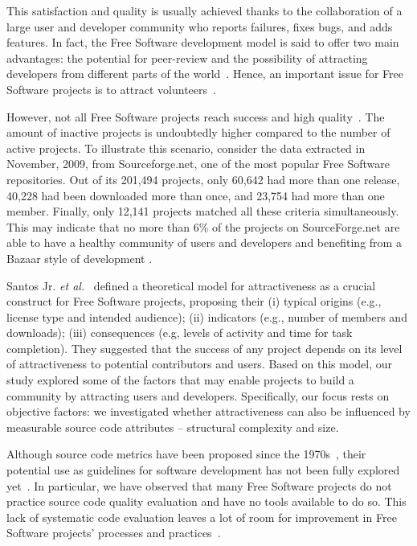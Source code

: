 \documentclass[conference]{IEEEtran}
\begin{document}
This satisfaction and quality is usually achieved thanks to the collaboration
of a large user and developer community who reports failures,
fixes bugs, and adds features.
%
In fact, the Free Software development model is said to offer two main advantages:
the potential for peer-review and the possibility of attracting developers
from different parts of the world~\cite{Michlmayr2005}.
%
Hence, an important issue for Free Software projects is to attract volunteers~\cite{Stewart2006}.

However, not all Free Software projects reach success and high quality~\cite{Michlmayr2005}.
The amount of inactive projects is undoubtedly higher compared to the number of active projects.
%
To illustrate this scenario, consider the data extracted in November, 2009,
from Sourceforge.net, one of the most popular Free Software repositories.
Out of its 201,494 projects, only 60,642 had more than one
release, 40,228 had been downloaded more than once, and 23,754 had more than one member.
%
Finally, only 12,141 projects matched all these criteria simultaneously.
This may indicate that no more than 6\% of the projects on
SourceForge.net are able to have a healthy community of users
and developers and benefiting from a Bazaar style of development
\cite{CatedralBazzar}.

Santos Jr. \emph{et al.}~\cite{Santos2010} defined a theoretical model for
attractiveness as a crucial construct for Free Software projects, proposing their
(i) typical origins (e.g., license type and intended audience);
(ii) indicators (e.g., number of members and downloads);
(iii) consequences (e.g, levels of activity and time for task completion).
%
They suggested that the success of any project depends on
its level of attractiveness to potential contributors and users.
%
Based on this model, our study explored some of the factors that may enable
projects to build a community by attracting users and developers.
%
Specifically, our focus rests on objective factors: we investigated whether
attractiveness can also be influenced by measurable source code attributes
-- structural complexity and size.

Although source code metrics have been proposed since the 1970s~\cite{SEI88},
their potential use as guidelines for software development has not
been fully explored yet~\cite{Tempero}.
%
In particular, we have observed that many Free Software projects do not practice
source code quality evaluation and have no tools available to do so.
%
This lack of systematic code evaluation leaves a lot of room for improvement
in Free Software projects' processes and practices~\cite{Michlmayr2005}.
\end{document}
